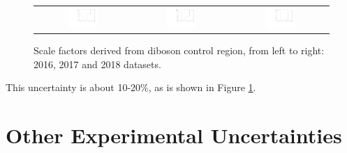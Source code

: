 \begin{figure}[tbh!]
 \begin{center}
 \begin{tabular}{ccc}
  \includegraphics[width=0.325\textwidth]{figures/Part3/Systematics/2016_VV_Sys_1D}&
    \includegraphics[width=0.325\textwidth]{figures/Part3/Systematics/2017_VV_Sys_1D}&
  \includegraphics[width=0.325\textwidth]{figures/Part3/Systematics/2018_VV_Sys_1D}\\
 \end{tabular}
 \caption{Scale factors derived from diboson control region, from left to right: 2016, 2017 and 2018 datasets.}
 \label{fig:SF_VV}
 \end{center}
\end{figure}

This uncertainty is about 10-20$\%$, as is shown in Figure \ref{fig:SF_VV}.

\section{Other Experimental Uncertainties}
\label{sec:OthUnc}

